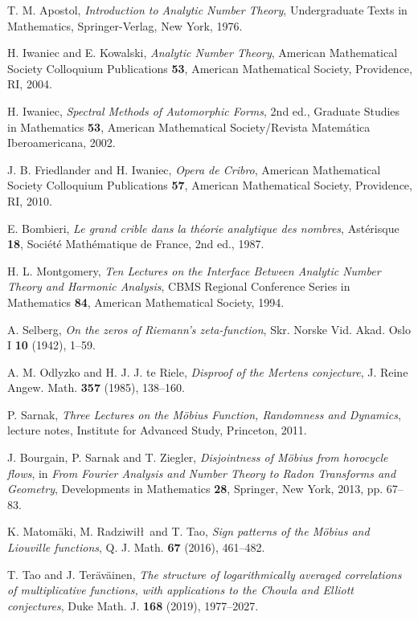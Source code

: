 T. M. Apostol, \emph{Introduction to Analytic Number Theory},
Undergraduate Texts in Mathematics, Springer-Verlag, New York, 1976.

H. Iwaniec and E. Kowalski, \emph{Analytic Number Theory},
American Mathematical Society Colloquium Publications \textbf{53},
American Mathematical Society, Providence, RI, 2004.

H. Iwaniec, \emph{Spectral Methods of Automorphic Forms}, 2nd ed.,
Graduate Studies in Mathematics \textbf{53},
American Mathematical Society/Revista Matem\'atica Iberoamericana, 2002.

J. B. Friedlander and H. Iwaniec, \emph{Opera de Cribro},
American Mathematical Society Colloquium Publications \textbf{57},
American Mathematical Society, Providence, RI, 2010.

E. Bombieri, \emph{Le grand crible dans la th\'eorie analytique des nombres},
Ast\'erisque \textbf{18}, Soci\'et\'e Math\'ematique de France,
2nd ed., 1987.

H. L. Montgomery, \emph{Ten Lectures on the Interface Between Analytic
Number Theory and Harmonic Analysis},
CBMS Regional Conference Series in Mathematics \textbf{84},
American Mathematical Society, 1994.

A. Selberg, \emph{On the zeros of Riemann's zeta-function},
Skr. Norske Vid. Akad. Oslo I \textbf{10} (1942), 1--59.

A. M. Odlyzko and H. J. J. te Riele,
\emph{Disproof of the Mertens conjecture},
J. Reine Angew. Math. \textbf{357} (1985), 138--160.

P. Sarnak, \emph{Three Lectures on the M\"obius Function, Randomness
and Dynamics}, lecture notes, Institute for Advanced Study, Princeton, 2011.

J. Bourgain, P. Sarnak and T. Ziegler, \emph{Disjointness of M\"obius
from horocycle flows}, in \emph{From Fourier Analysis and Number Theory
to Radon Transforms and Geometry}, Developments in Mathematics
\textbf{28}, Springer, New York, 2013, pp. 67--83.

K. Matom\"aki, M. Radziwi\l\l\ and T. Tao,
\emph{Sign patterns of the M\"obius and Liouville functions},
Q. J. Math. \textbf{67} (2016), 461--482.

T. Tao and J. Ter\"av\"ainen, \emph{The structure of logarithmically
averaged correlations of multiplicative functions, with applications
to the Chowla and Elliott conjectures},
Duke Math. J. \textbf{168} (2019), 1977--2027.

